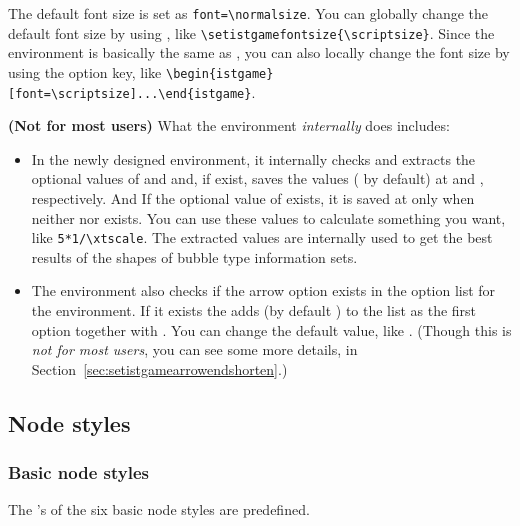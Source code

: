 The default font size is set as \verb|font=\normalsize|. 
You can globally change the default font size by using \icmd{\setistgamefontsize}, like 
\verb|\setistgamefontsize{\scriptsize}|.
Since the environment  is basically the same as , you can also locally change the font size by using the  option key, like
\verb|\begin{istgame}[font=\scriptsize]...\end{istgame}|. 

\remark \textbf{(Not for most users)} What the  environment \emph{internally} does includes:

\begin{itemize}
\item
In the newly designed  environment, it internally checks and extracts the optional values of  and  and, if exist, saves the values ( by default) at \icmd{\xtxscale} and \icmd{\xtyscale}, respectively.
And If the optional value of  exists, it is saved at \icmd{\xtscale} only when neither  nor  exists.
You can use these values to calculate something you want, like \verb|5*1/\xtscale|. 
The extracted values are internally used to get the best results of the shapes of bubble type information sets.
\item
The  environment also checks if the arrow option \xw{[->]} exists in the option list for the environment. If it exists the  adds  (by default \xw{0pt}) to the list as the first option together with \xw{[->]}.
You can change the default value, 
like \cmd{\setistgameshorten\{1.3pt\}}. (Though this is \emph{not for most users}, you can see some more details, in Section~\ref{sec:setistgamearrowendshorten}.)
\end{itemize}


\subsection{Node styles}
\label{sec:nodestyles}

\subsubsection{Basic node styles}

The 's of the six basic node styles are predefined.

